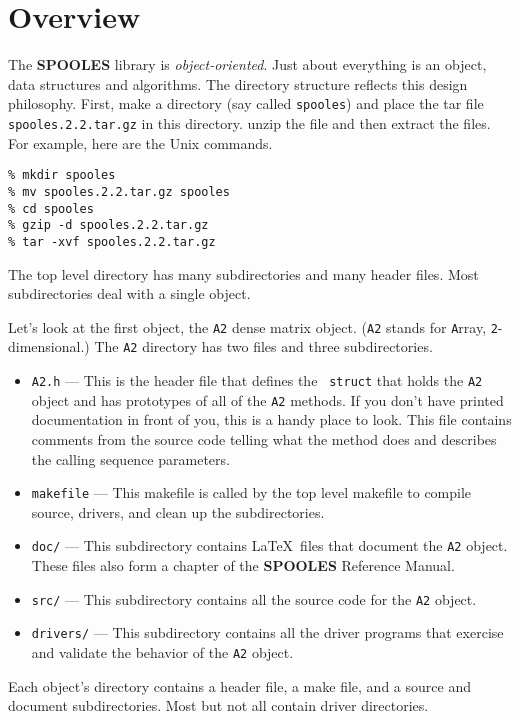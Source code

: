 \section{Overview}
\label{section:overview}
\par
The {\bf SPOOLES} library is {\it object-oriented}.
Just about everything is an object, data structures and algorithms.
The directory structure reflects this design philosophy.
First, make a directory (say called {\tt spooles}) 
and place the tar file {\tt spooles.2.2.tar.gz} in this directory.
unzip the file and then extract the files.
For example, here are the Unix commands.
\begin{verbatim}
% mkdir spooles
% mv spooles.2.2.tar.gz spooles
% cd spooles
% gzip -d spooles.2.2.tar.gz
% tar -xvf spooles.2.2.tar.gz
\end{verbatim}
The top level directory has many subdirectories and many header files.
Most subdirectories deal with a single object.
\par
Let's look at the first object, the {\tt A2} dense matrix
object. ({\tt A2} stands for {\tt A}rray, {\tt 2}-dimensional.)
The {\tt A2} directory has two files and three subdirectories.
\begin{itemize}
\item
{\tt A2.h} --- This is the header file that defines the {\tt
struct} that holds the {\tt A2} object and has prototypes of all
of the {\tt A2} methods.
If you don't have printed documentation in front of you, this is a
handy place to look.
This file contains comments from the source code telling what the
method does and describes the calling sequence parameters.
\item
{\tt makefile} --- This makefile is called by the top level
makefile to compile source, drivers, and clean up the
subdirectories.
\item
{\tt doc/} --- This subdirectory contains \LaTeX\ files that
document the {\tt A2} object. 
These files also form a chapter of the {\bf SPOOLES} Reference
Manual.
\item
{\tt src/} --- This subdirectory contains all the source code for
the {\tt A2} object.
\item
{\tt drivers/} --- This subdirectory contains all the driver
programs that exercise and validate the behavior of the {\tt A2} object.
\end{itemize}
Each object's directory contains a header file, a make file, and a
source and document subdirectories.
Most but not all contain driver directories.
\par
